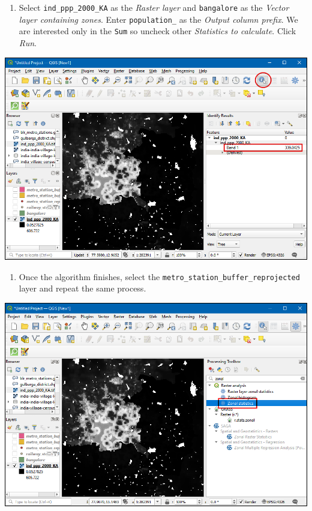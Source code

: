 \documentclass[
  12pt,
  a4paper]{article}
\providecommand{\tightlist}{%
  \setlength{\itemsep}{0pt}\setlength{\parskip}{0pt}}
\begin{document}
\begin{enumerate}
\def\labelenumi{\arabic{enumi}.}
\setcounter{enumi}{14}
\tightlist
\item
  Select \texttt{ind\_ppp\_2000\_KA} as the \emph{Raster layer} and
  \texttt{bangalore} as the \emph{Vector layer containing zones}. Enter
  \texttt{population\_} as the \emph{Output column prefix}. We are
  interested only in the \texttt{Sum} so uncheck other \emph{Statistics
  to calculate}. Click \emph{Run}.
\end{enumerate}

\begin{center}\includegraphics[width=0.75\linewidth]{images/spatial_data_viz/pop15} \end{center}

\begin{enumerate}
\def\labelenumi{\arabic{enumi}.}
\setcounter{enumi}{15}
\tightlist
\item
  Once the algorithm finishes, select the
  \texttt{metro\_station\_buffer\_reprojected} layer and repeat the same
  process.
\end{enumerate}

\begin{center}\includegraphics[width=0.75\linewidth]{images/spatial_data_viz/pop16} \end{center}
\end{document}

